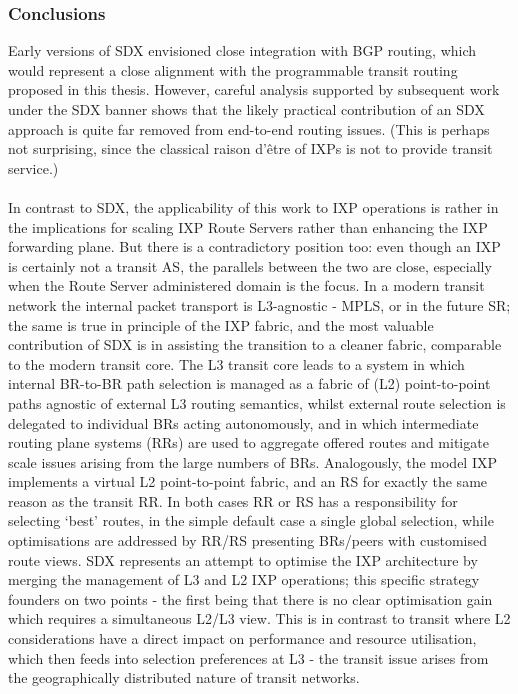 \subsubsection{Conclusions}
Early versions of SDX envisioned close integration with BGP routing, which would represent a close alignment with the programmable transit routing proposed in this thesis. However, careful analysis supported by subsequent work under the SDX banner shows that the likely practical contribution of an SDX approach is quite far removed from end-to-end routing issues.
(This is perhaps not surprising, since the classical raison d'être of IXPs is not to provide transit service.)
\\
\\
In contrast to SDX, the applicability of this work to IXP operations is rather in the implications for scaling IXP Route Servers rather than enhancing the IXP forwarding plane.
But there is a contradictory position too: even though an IXP is certainly not a transit AS, the parallels between the two are close, especially when the Route Server administered domain is the focus.
In a modern transit network the internal packet transport is L3-agnostic - MPLS, or in the future SR; the same is true in principle of the IXP fabric, and the most valuable contribution of SDX is in assisting the transition to a cleaner fabric, comparable to the modern transit core.
The L3 transit core leads to a system in which internal  BR-to-BR path selection is managed as a fabric of (L2) point-to-point paths agnostic of external L3 routing semantics, whilst external route selection is delegated to individual BRs acting autonomously, and in which intermediate routing plane systems (RRs) are used to aggregate offered routes and mitigate scale issues arising from the large numbers of BRs. Analogously, the model IXP implements a virtual L2 point-to-point fabric, and an RS for exactly the same reason as the transit RR.
In both cases RR or RS has a responsibility for selecting `best' routes, in the simple default case a single global selection, while optimisations are addressed by RR/RS presenting BRs/peers with customised route views.
SDX represents an attempt to optimise the IXP architecture by merging the management of L3 and L2 IXP operations; this specific strategy founders on two points - the first being that there is no clear optimisation gain which requires a simultaneous L2/L3 view. This is in contrast to transit where L2 considerations have a direct impact on performance and resource utilisation, which then feeds into selection preferences at L3 - the transit issue arises from the geographically distributed nature of transit networks.
